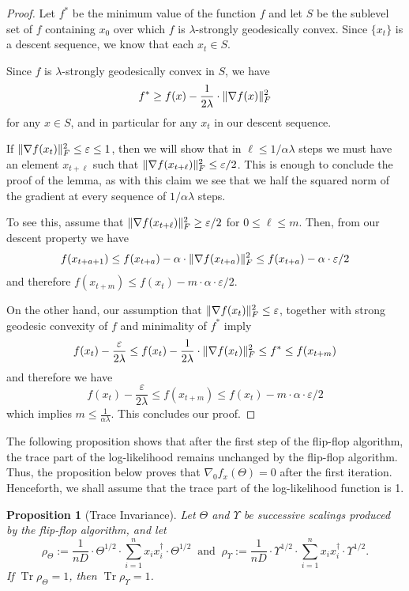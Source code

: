 \documentclass[aos]{imsart}
\newtheorem{prop}[theorem]{Proposition}
\theoremstyle{definition}
\numberwithin{equation}{section}
\DeclareMathOperator{\tr}{Tr}
\DeclarePairedDelimiter{\norm}{\lVert}{\rVert}
\begin{document}
\begin{proof}
	Let $f^*$ be the minimum value of the function $f$ and let $S$ be the sublevel set of $f$ containing $x_0$ over which $f$ is $\lambda$-strongly geodesically convex. Since $\{x_t\}$ is a descent sequence, we know that each $x_t \in S$.

	Since $f$ is $\lambda$-strongly geodesically convex in $S$, we have
	$$ f^* \geq f(x) - \frac{1}{2\lambda} \cdot \norm{\nabla f(x)}_F^2 $$
	for any $x \in S$, and in particular for any $x_t$ in our descent sequence.

	If $\norm{\nabla f(x_t)}_F^2 \leq \varepsilon \leq 1$, then we will show that in $\ell \leq 1/\alpha \lambda$ steps we must have an element $x_{t+\ell}$ such that $\norm{\nabla f(x_{t + \ell})}_F^2 \leq \varepsilon/2$. This is enough to conclude the proof of the lemma, as with this claim we see that we half the squared norm of the gradient at every sequence of $1/\alpha \lambda$ steps.

	To see this, assume that $\norm{\nabla f(x_{t+\ell})}_F^2 \geq \varepsilon/2$ for $0 \leq \ell \leq m$. 
	Then, from our descent property we have
	$$ f(x_{t+a+1}) \leq f(x_{t+a}) - \alpha \cdot \norm{\nabla f(x_{t+a})}^2_F \leq f(x_{t+a}) - \alpha \cdot \varepsilon/2$$
	and therefore $f(x_{t + m}) \leq f(x_t) - m \cdot \alpha \cdot \varepsilon/2$.

	On the other hand, our assumption that $\norm{\nabla f(x_t)}_F^2 \leq \varepsilon$, together with strong geodesic convexity of $f$ and minimality of $f^*$ imply
	$$ f(x_t) - \frac{\varepsilon}{2\lambda} \leq f(x_t) - \frac{1}{2\lambda} \cdot \norm{\nabla f(x_t)}_F^2 \leq f^* \leq f(x_{t+m}) $$
	and therefore we have
	$$ f(x_t) - \frac{\varepsilon}{2\lambda} \leq f(x_{t + m}) \leq f(x_t) - m \cdot \alpha \cdot \varepsilon/2 $$
	which implies $m \leq \frac{1}{\alpha \lambda}$. This concludes our proof.
\end{proof}

The following proposition shows that after the first step of the flip-flop algorithm, the trace part of the log-likelihood remains unchanged by the flip-flop algorithm.
Thus, the proposition below proves that $\nabla_0 f_x(\Theta) = 0$ after the first iteration. Henceforth, we shall assume that the trace part of the log-likelihood function is 1.

\begin{prop}[Trace Invariance]\label{prop:trace-invariance}
	Let $\Theta$ and $\Upsilon$ be successive scalings produced by the flip-flop algorithm, and let 
	$$\rho_\Theta := \dfrac{1}{nD} \cdot \Theta^{1/2} \cdot \sum_{i=1}^n x_i x_i^\dagger \cdot \Theta^{1/2} \ \text{ and } \ \rho_\Upsilon := \dfrac{1}{nD} \cdot \Upsilon^{1/2} \cdot \sum_{i=1}^n x_i x_i^\dagger \cdot \Upsilon^{1/2}.$$ 
	If $\tr \rho_\Theta = 1$, then $\tr \rho_\Upsilon = 1$.
\end{prop}
\end{document}
